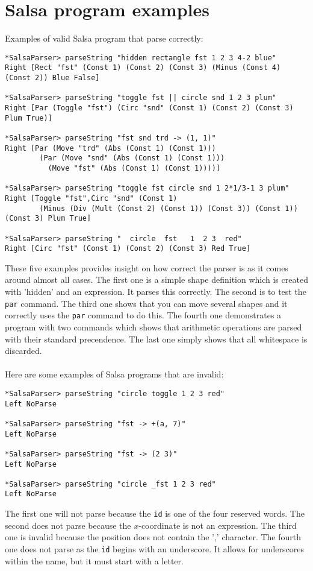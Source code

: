 \documentclass[a4paper]{article}
\begin{document}
\section*{Salsa program examples}
Examples of valid Salsa program that parse correctly:
\begin{verbatim}
*SalsaParser> parseString "hidden rectangle fst 1 2 3 4-2 blue"
Right [Rect "fst" (Const 1) (Const 2) (Const 3) (Minus (Const 4) (Const 2)) Blue False]

*SalsaParser> parseString "toggle fst || circle snd 1 2 3 plum"
Right [Par (Toggle "fst") (Circ "snd" (Const 1) (Const 2) (Const 3) Plum True)]

*SalsaParser> parseString "fst snd trd -> (1, 1)"
Right [Par (Move "trd" (Abs (Const 1) (Const 1)))
        (Par (Move "snd" (Abs (Const 1) (Const 1)))
          (Move "fst" (Abs (Const 1) (Const 1))))]

*SalsaParser> parseString "toggle fst circle snd 1 2*1/3-1 3 plum"
Right [Toggle "fst",Circ "snd" (Const 1)
        (Minus (Div (Mult (Const 2) (Const 1)) (Const 3)) (Const 1)) (Const 3) Plum True]

*SalsaParser> parseString "  circle  fst   1  2 3  red"
Right [Circ "fst" (Const 1) (Const 2) (Const 3) Red True]
\end{verbatim}
These five examples provides insight on how correct the parser is as it comes around almost all cases. The first one is a simple shape definition which is created with 'hidden' and an expression. It parses this correctly. The second is to test the \texttt{par} command. The third one shows that you can move several shapes and it correctly uses the \texttt{par} command to do this. The fourth one demonstrates a program with two commands which shows that arithmetic operations are parsed with their standard precendence. The last one simply shows that all whitespace is discarded. \\
\\
Here are some examples of Salsa programs that are invalid:
\begin{verbatim}
*SalsaParser> parseString "circle toggle 1 2 3 red"
Left NoParse

*SalsaParser> parseString "fst -> +(a, 7)"
Left NoParse

*SalsaParser> parseString "fst -> (2 3)"
Left NoParse

*SalsaParser> parseString "circle _fst 1 2 3 red"
Left NoParse
\end{verbatim}
The first one will not parse because the \texttt{id} is one of the four reserved words. The second does not parse because the $x$-coordinate is not an expression. The third one is invalid because the position does not contain the ',' character. The fourth one does not parse as the \texttt{id} begins with an underscore. It allows for underscores within the name, but it must start with a letter.
\end{document}
